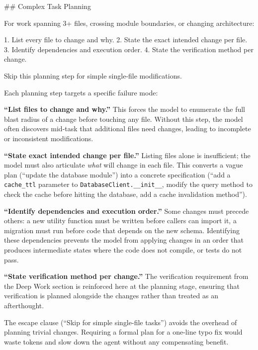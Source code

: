 \documentclass{article}
\begin{document}
\begin{prompt}
## Complex Task Planning

For work spanning 3+ files, crossing module boundaries,
or changing architecture:

1. List every file to change and why.
2. State the exact intended change per file.
3. Identify dependencies and execution order.
4. State the verification method per change.

Skip this planning step for simple single-file
modifications.
\end{prompt}

\noindent Each planning step targets a specific failure mode:

\textbf{``List files to change and why.''}  This forces the model to enumerate the full blast radius of a change before touching any file.  Without this step, the model often discovers mid-task that additional files need changes, leading to incomplete or inconsistent modifications.

\textbf{``State exact intended change per file.''} Listing files alone is insufficient; the model must also articulate \emph{what} will change in each file.  This converts a vague plan (``update the database module'') into a concrete specification (``add a \texttt{cache\_ttl} parameter to \texttt{DatabaseClient.\_\_init\_\_}, modify the query method to check the cache before hitting the database, add a cache invalidation method'').

\textbf{``Identify dependencies and execution order.''}  Some changes must precede others: a new utility function must be written before callers can import it, a migration must run before code that depends on the new schema.  Identifying these dependencies prevents the model from applying changes in an order that produces intermediate states where the code does not compile, or tests do not pass.

\textbf{``State verification method per change.''}  The verification requirement from the Deep Work section is reinforced here at the planning stage, ensuring that verification is planned alongside the changes rather than treated as an afterthought.

\noindent The escape clause (``Skip for simple single-file tasks'') avoids the overhead of planning trivial changes.  Requiring a formal plan for a one-line typo fix would waste tokens and slow down the agent without any compensating benefit.

\end{document}
